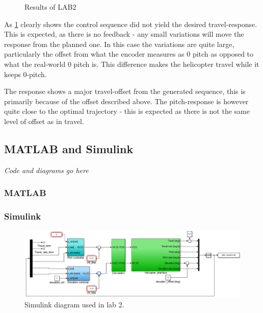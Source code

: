 \documentclass[../main.tex]{subfiles}
\begin{document}
\begin{figure}[h]
    \begin{center}
        
    \end{center}
	\caption{Results of LAB2}
	\label{fig:LAB2_plot_1}
\end{figure}

As \cref{fig:LAB2_plot_1} clearly shows the control sequence did not yield the desired travel-response. This is expected, as there is no feedback - any small variations will move the response from the planned one. In this case the variations are quite large, particularly the offset from what the encoder measures as $0$ pitch as opposed to what the real-world $0$ pitch is. This difference makes the helicopter travel while it keeps $0$-pitch.

The response shows a major travel-offset from the generated sequence, this is primarily because of the offset described above. The pitch-response is however quite close to the optimal trajectory - this is expected as there is not the same level of offset as in travel.

\subsection{MATLAB and Simulink}
\textit{Code and diagrams go here}
\subsubsection{MATLAB}

\subsubsection{Simulink}
\begin{figure}[h]
	\centering
	\includegraphics[width=\linewidth]{code/lab2_simulink}
	\caption{Simulink diagram used in lab 2.}
	\label{fig:lab2_simulink}
\end{figure}
\end{document}
